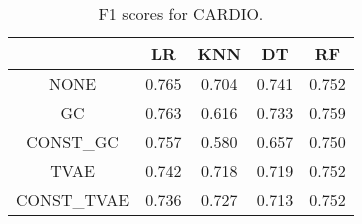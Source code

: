 \begin{table}
\caption{F1 scores for CARDIO.}
\label{tab:f1-CARDIO}
\begin{tabular}{ccccc}
\toprule
 & LR & KNN & DT & RF \\
\midrule
NONE & 0.765 & 0.704 & 0.741 & 0.752 \\
GC & 0.763 & 0.616 & 0.733 & 0.759 \\
CONST\_GC & 0.757 & 0.580 & 0.657 & 0.750 \\
TVAE & 0.742 & 0.718 & 0.719 & 0.752 \\
CONST\_TVAE & 0.736 & 0.727 & 0.713 & 0.752 \\
\bottomrule
\end{tabular}
\end{table}
